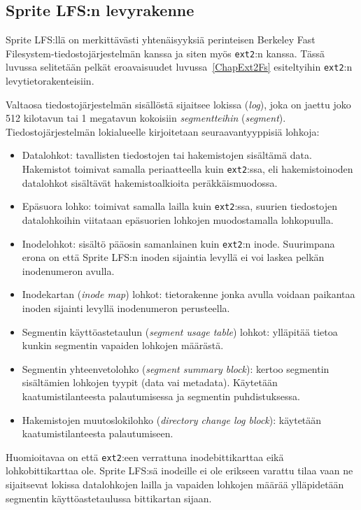 \subsection{Sprite LFS:n levyrakenne}

Sprite LFS:llä on merkittävästi yhtenäisyyksiä perinteisen Berkeley Fast Filesystem-tiedostojärjestelmän kanssa ja siten myös \texttt{ext2}:n kanssa.
Tässä luvussa selitetään pelkät eroavaisuudet luvussa~\ref{ChapExt2Fs} esiteltyihin \texttt{ext2}:n levytietorakenteisiin.

Valtaosa tiedostojärjestelmän sisällöstä sijaitsee lokissa (\emph{log}), joka on jaettu joko 512 kilotavun tai 1 megatavun kokoisiin \emph{segmentteihin} (\emph{segment}).
Tiedostojärjestelmän lokialueelle kirjoitetaan seuraavantyyppisiä lohkoja:

\begin{itemize}
    \item{Datalohkot: tavallisten tiedostojen tai hakemistojen sisältämä data.
        Hakemistot toimivat samalla periaatteella kuin \texttt{ext2}:ssa, eli hakemistoinoden datalohkot sisältävät hakemistoalkioita peräkkäismuodossa.}
    \item{Epäsuora lohko: toimivat samalla lailla kuin \texttt{ext2}:ssa, suurien tiedostojen datalohkoihin viitataan epäsuorien lohkojen muodostamalla lohkopuulla.}
    \item{Inodelohkot: sisältö pääosin samanlainen kuin \texttt{ext2}:n inode. Suurimpana erona on että Sprite LFS:n inoden sijaintia levyllä ei voi laskea pelkän inodenumeron avulla.}
    \item{Inodekartan (\emph{inode map}) lohkot: tietorakenne jonka avulla voidaan paikantaa inoden sijainti levyllä inodenumeron perusteella.}
    \item{Segmentin käyttöastetaulun (\emph{segment usage table}) lohkot: ylläpitää tietoa kunkin segmentin vapaiden lohkojen määrästä.}
    \item{Segmentin yhteenvetolohko (\emph{segment summary block}): kertoo segmentin sisältämien lohkojen tyypit (data vai metadata). Käytetään kaatumistilanteesta palautumisessa ja segmentin puhdistuksessa.}
    \item{Hakemistojen muutoslokilohko (\emph{directory change log block}): käytetään kaatumistilanteesta palautumiseen.}
\end{itemize}
Huomioitavaa on että \texttt{ext2}:een verrattuna inodebittikarttaa eikä lohkobittikarttaa ole.
Sprite LFS:sä inodeille ei ole erikseen varattu tilaa vaan ne sijaitsevat lokissa datalohkojen lailla
ja vapaiden lohkojen määrää ylläpidetään segmentin käyttöastetaulussa bittikartan sijaan.

